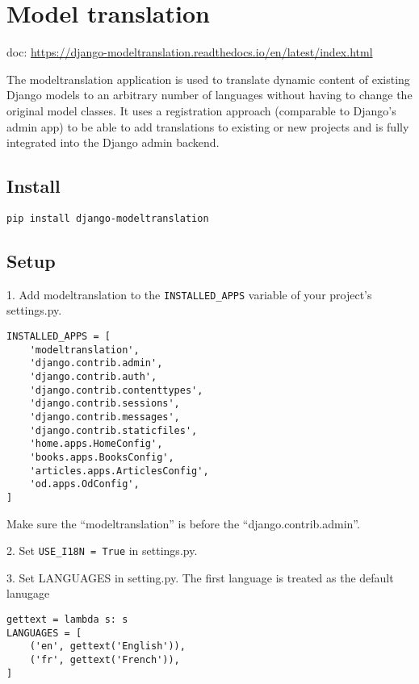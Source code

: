 \section{Model translation}

doc: \url{https://django-modeltranslation.readthedocs.io/en/latest/index.html}

The modeltranslation application is used to translate dynamic content of existing Django models to an arbitrary number of languages without having to change the original model classes. It uses a registration approach (comparable to Django's admin app) to be able to add translations to existing or new projects and is fully integrated into the Django admin backend.

\subsection{Install}


\begin{lstlisting}
pip install django-modeltranslation  
\end{lstlisting}


\subsection{Setup}


1. Add modeltranslation to the \verb|INSTALLED_APPS| variable of your project’s settings.py.

\begin{lstlisting}
INSTALLED_APPS = [
    'modeltranslation',
    'django.contrib.admin',
    'django.contrib.auth',
    'django.contrib.contenttypes',
    'django.contrib.sessions',
    'django.contrib.messages',
    'django.contrib.staticfiles',
    'home.apps.HomeConfig',
    'books.apps.BooksConfig',
    'articles.apps.ArticlesConfig',
    'od.apps.OdConfig',
]  
\end{lstlisting}

Make sure the ``modeltranslation'' is before the ``django.contrib.admin''.

2. Set \verb|USE_I18N = True| in settings.py.

3. Set LANGUAGES in setting.py. The first language is treated as the default lanugage

\begin{lstlisting}
gettext = lambda s: s
LANGUAGES = [
    ('en', gettext('English')),
    ('fr', gettext('French')),
]
\end{lstlisting}

